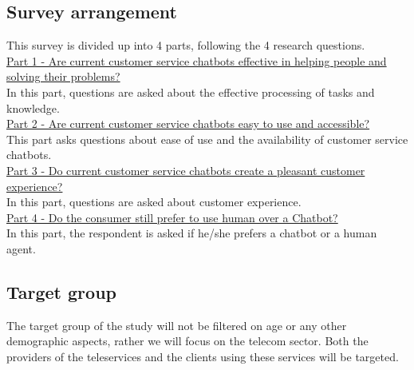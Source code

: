 \subsection{Survey arrangement}
This survey is divided up into 4 parts, following the 4 research questions.\\
\break
\ul{Part 1 - Are current customer service chatbots effective in helping people and solving their problems?}\\
In this part, questions are asked about the effective processing of tasks and knowledge.\\
\break
\ul{Part 2 - Are current customer service chatbots easy to use and accessible?}\\
This part asks questions about ease of use and the availability of customer service chatbots.\\
\break
\ul{Part 3 - Do current customer service chatbots create a pleasant customer experience?}\\
In this part, questions are asked about customer experience.\\
\break
\ul{Part 4 - Do the consumer still prefer to use human over a Chatbot?}\\
In this part, the respondent is asked if he/she prefers a chatbot or a human agent.\\ 

\subsection{Target group}
The target group of the study will not be filtered on age or any other demographic aspects, rather we will focus on the telecom sector. Both the providers of the teleservices and the clients using these services will be targeted.

